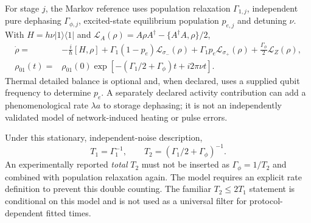 \documentclass[11pt,a4paper]{article}
\newcommand{\ket}[1]{\lvert #1\rangle}
\newcommand{\bra}[1]{\langle #1\rvert}
\begin{document}
For stage $j$, the Markov reference uses population relaxation $\Gamma_{1,j}$, independent pure dephasing $\Gamma_{\phi,j}$, excited-state equilibrium population $p_{e,j}$ and detuning $\nu$. With $H=h\nu\ket{1}\bra{1}$ and $\mathcal L_A(\rho)=A\rho A^\dagger-\{A^\dagger A,\rho\}/2$,
\begin{align}
\dot\rho={}&-\frac{i}{\hbar}[H,\rho]
+\Gamma_1(1-p_e)\mathcal L_{\sigma_-}(\rho)
+\Gamma_1p_e\mathcal L_{\sigma_+}(\rho)
+\frac{\Gamma_\phi}{2}\mathcal L_Z(\rho),\\
\rho_{01}(t)={}&\rho_{01}(0)\exp[-(\Gamma_1/2+\Gamma_\phi)t+i2\pi\nu t].
\end{align}
Thermal detailed balance is optional and, when declared, uses a supplied qubit frequency to determine $p_e$. A separately declared activity contribution can add a phenomenological rate $\lambda a$ to storage dephasing; it is not an independently validated model of network-induced heating or pulse errors.

Under this stationary, independent-noise description,
\begin{equation}
T_1=\Gamma_1^{-1},\qquad T_2=(\Gamma_1/2+\Gamma_\phi)^{-1}.
\label{eq:t2markov}
\end{equation}
An experimentally reported \emph{total} $T_2$ must not be inserted as $\Gamma_\phi=1/T_2$ and combined with population relaxation again. The model requires an explicit rate definition to prevent this double counting. The familiar $T_2\leq 2T_1$ statement is conditional on this model and is not used as a universal filter for protocol-dependent fitted times.
\end{document}
